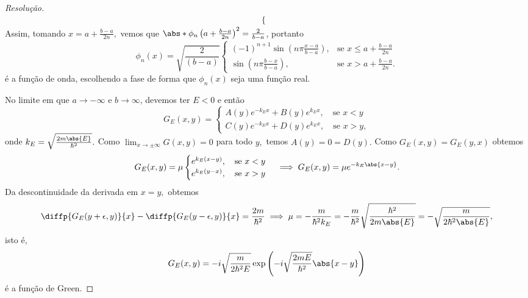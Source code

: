 \begin{proof}[Resolução]
\begin{align*}
\begin{cases}
      \end{cases}
   \end{align*}
   Assim, tomando \(x = a + \frac{b-a}{2n},\) vemos que \(\abs*{\phi_n\left(a + \frac{b-a}{2n}\right)}^2 = \frac{2}{b-a}\), portanto
   \begin{equation*}
       \phi_n(x) = \sqrt{\frac{2}{(b-a)}} \begin{cases}
         \displaystyle (-1)^{n + 1}\sin\left(n\pi \frac{x - a}{b-a}\right),&\text{se }x \leq a+\frac{b-a}{2n}\\
         \displaystyle \sin\left(n\pi \frac{b - x}{b-a}\right),&\text{se }x > a+\frac{b-a}{2n}.
      \end{cases}
   \end{equation*}
   é a função de onda, escolhendo a fase de forma que \(\phi_n(x)\) seja uma função real.

   No limite em que \(a \to -\infty\) e \(b \to \infty\), devemos ter \(E < 0\) e então
   \begin{equation*}
       G_E(x, y) = \begin{cases}
          A(y) e^{-k_E x} + B(y) e^{k_E x}, \quad\text{se }x < y\\
          C(y) e^{-k_E x} + D(y) e^{k_E x}, \quad\text{se }x > y,
       \end{cases}
   \end{equation*}
   onde \(k_E = \sqrt{\frac{2m \abs{E}}{\hbar^2}}.\) Como \(\lim_{x \to \pm\infty} G(x,y) = 0\) para todo \(y,\) temos \(A(y) = 0 = D(y).\) Como \(G_E(x,y) = G_E(y,x)\) obtemos
   \begin{equation*}
       G_E(x,y) = \mu\begin{cases}
          e^{k_E(x - y)}, \quad\text{se }x < y\\
          e^{k_E(y - x)}, \quad\text{se }x > y
       \end{cases} \implies G_E(x,y) = \mu e^{-k_E \abs{x - y}}.
   \end{equation*}
   Da descontinuidade da derivada em \(x = y,\) obtemos
   \begin{equation*}
      \diffp{G_E(y + \epsilon, y)}{x} - \diffp{G_E(y-\epsilon, y)}{x} = \frac{2m}{\hbar^2} \implies \mu = -\frac{m}{\hbar^2k_E} = -\frac{m}{\hbar^2} \sqrt{\frac{\hbar^2}{2m \abs{E}}} = - \sqrt{\frac{m}{2\hbar^2 \abs{E}}},
   \end{equation*}
   isto é,
   \begin{equation*}
      G_E(x,y) = - i\sqrt{\frac{m}{2\hbar^2 E}} \exp\left(-i\sqrt{\frac{2m E}{\hbar^2}} \abs{x - y}\right)
   \end{equation*}
   é a função de Green.
\end{proof}
